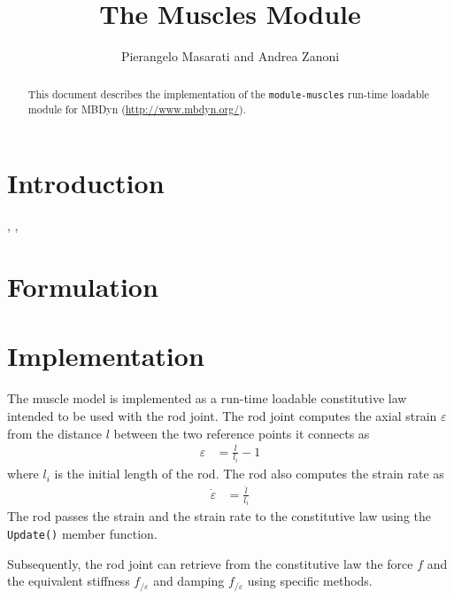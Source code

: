 \documentclass{article}
\begin{document}
\title{The Muscles Module}
\author{Pierangelo Masarati and Andrea Zanoni}
\date{}
\maketitle

\begin{abstract}
This document describes the implementation of the \texttt{module-muscles}
run-time loadable module for MBDyn (\url{http://www.mbdyn.org/}).
\end{abstract}

\section{Introduction}
\cite{PENNESTRI-2007-JB},
\cite{ZANONI-2012-IMSD},
\cite{ZANONI-2012-IMECE}



\section{Formulation}



\section{Implementation}
The muscle model is implemented as a run-time loadable constitutive law
intended to be used with the rod joint.
The rod joint computes the axial strain $\varepsilon$
from the distance $l$ between the two reference points it connects as
\begin{align}
	\varepsilon
	&=
	\frac{l}{l_i} - 1
\end{align}
where $l_i$ is the initial length of the rod.
The rod also computes the strain rate as
\begin{align}
	\dot{\varepsilon}
	&=
	\frac{\dot{l}}{l_i}
\end{align}
The rod passes the strain and the strain rate to the constitutive law
using the \texttt{Update()} member function.

Subsequently, the rod joint can retrieve from the constitutive law
the force $f$ and the equivalent stiffness $f_{/\varepsilon}$
and damping $f_{/\dot{\varepsilon}}$ using specific methods.
\end{document}
